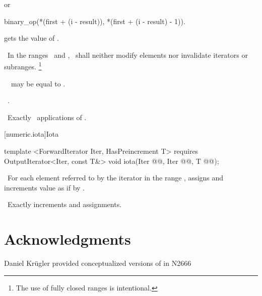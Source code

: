 \documentclass[american,twoside]{book}
\begin{document}
\begin{paras}
\begin{itemdescr}
or

\begin{codeblock}
binary_op(*(first + (i - result)), *(first + (i - result) - 1)).
\end{codeblock}

gets the value of
.

\pnum
\requires\ 
In the ranges
\
and
,
\
shall neither modify elements nor invalidate iterators or subranges.%
\footnote{The use of fully closed ranges is intentional.
}

\pnum
\notes\ 
\
may be equal to
.

\pnum
\returns\ 
.

\pnum
\complexity\ 
Exactly
\
applications of
.
\end{itemdescr}

\rSec2[numeric.iota]{Iota}
%
\color{addclr}\begin{itemdecl}
template <ForwardIterator Iter, HasPreincrement T>
  requires OutputIterator<Iter, const T&>
  void iota(Iter @@, Iter @@, T @@);
\end{itemdecl}\color{black}

\begin{itemdescr}
\pnum
{}

\pnum
\effects\
For each element referred to by the iterator  in the range \tcode{[first,last)}, assigns  and increments value as if by .

\pnum
\complexity\
Exactly  increments and assignments.
\end{itemdescr}

\end{paras}

\section*{Acknowledgments}
Daniel Kr\"ugler provided conceptualized
versions of  in N2666



\end{document}
